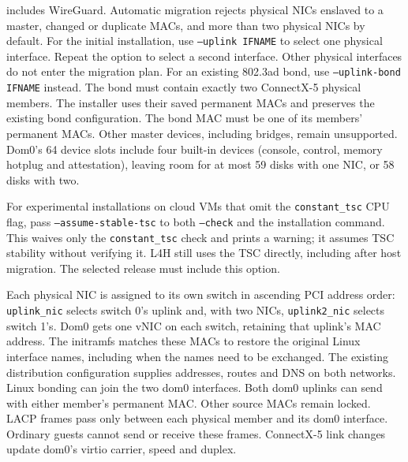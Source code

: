 \documentclass[11pt,a4paper]{report}
\begin{document}
\begin{itemize}
        includes WireGuard. Automatic migration rejects physical NICs
        enslaved to a master, changed or duplicate
        MACs, and more than two physical NICs by default.
        For the initial installation, use \texttt{--uplink IFNAME} to select one physical interface.
        Repeat the option to select a second interface. Other physical
        interfaces do not enter the migration plan.
        For an existing 802.3ad bond, use \texttt{--uplink-bond IFNAME} instead.
        The bond must contain exactly two ConnectX-5 physical members. The installer
        uses their saved permanent MACs and preserves the existing bond configuration.
        The bond MAC must be one of its members' permanent MACs.
        Other master devices, including bridges, remain unsupported.
        Dom0's 64 device slots include four built-in devices (console,
        control, memory hotplug and attestation), leaving room for at most
        59 disks with one NIC, or 58 disks with two.
\end{itemize}

For experimental installations on cloud VMs that omit the
\texttt{constant\_tsc} CPU flag, pass \texttt{--assume-stable-tsc} to both
\texttt{--check} and the installation command. This waives only the
\texttt{constant\_tsc} check and prints a warning; it assumes TSC stability
without verifying it. L4H still uses the TSC directly, including after
host migration. The selected release must include this option.

Each physical NIC is assigned to its own switch in ascending PCI address
order: \texttt{uplink\_nic} selects switch 0's uplink and, with two NICs,
\texttt{uplink2\_nic} selects switch 1's. Dom0 gets one vNIC on each
switch, retaining that uplink's MAC address. The initramfs matches these
MACs to restore the original Linux interface names, including when the
names need to be exchanged. The existing distribution configuration
supplies addresses, routes and DNS on both networks.
Linux bonding can join the two dom0 interfaces. Both dom0 uplinks can
send with either member's permanent MAC. Other source MACs
remain locked. LACP frames pass only between each physical member and its
dom0 interface. Ordinary guests cannot send or receive these frames.
ConnectX-5 link changes update dom0's virtio carrier, speed and duplex.
\end{document}
